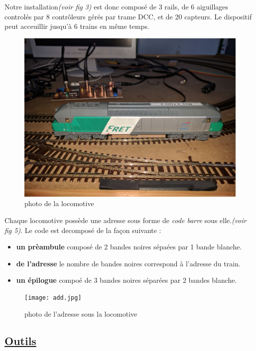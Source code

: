 \newpage

  Notre installation\emph{(voir fig 3)} est donc compos\'e de 3 rails, de 6 aiguillages
control\'es par 8 contr\^oleurs gérés par trame DCC, et de 20 capteurs.
Le dispositif peut acceuillir jusqu'\`a 6 trains en m\^eme temps.

\begin{figure}[ht]
\centering
\includegraphics[scale=0.03]{loco.jpg}
\caption{photo de la locomotive}
\label{fig4}
\end{figure}

  Chaque locomotive poss\`ede une adresse sous forme de \emph{code
  barre} sous elle.\emph{(voir fig 5)}.
Le code \barre est decompos\'e de la façon suivante :
\begin{itemize}
    \item \textbf{un pr\`eambule} compos\'e de 2 bandes noires
      s\'epa\'ees par 1 bande blanche.
    \item \textbf{de l'adresse} le nombre de bandes noires correspond
      à l'adresse du train. 
    \item \textbf{un  \'epilogue} compo\'e de 3 bandes noires
      s\'epar\'ees par 2 bandes blanche.
\end{itemize}

\begin{figure}[ht]
\centering
\texttt{[image: add.jpg]}
\caption{photo de l'adresse sous la locomotive}
\label{fig5}
\end{figure}

\newpage


\subsection{\underline{ Outils}}
\label{sec:outils}

